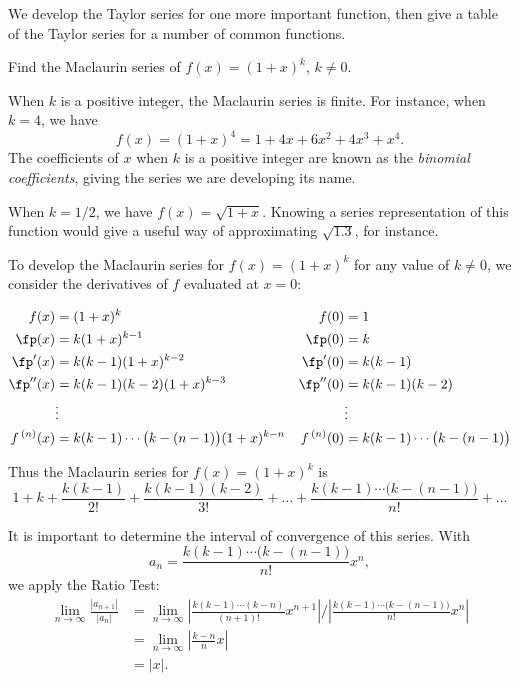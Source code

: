 We develop the Taylor series for one more important function, then give a table of the Taylor series for a number of common functions.

{Find the Maclaurin series of $f(x) = (1+x)^k$, $k\neq 0$.
}
{When $k$ is a positive integer, the Maclaurin series is finite. For instance, when $k=4$, we have 
$$f(x) = (1+x)^4 = 1+4x+6x^2+4x^3+x^4.$$
The coefficients of $x$ when $k$ is a positive integer are known as the \emph{binomial coefficients}, giving the series we are developing its name.

When $k=1/2$, we have $f(x) = \sqrt{1+x}$. Knowing a series representation of this function would give a useful way of approximating $\sqrt{1.3}$, for instance.

To develop the Maclaurin series for $f(x) = (1+x)^k$ for any value of $k\neq0$, we consider the derivatives of $f$ evaluated at $x=0$:

\noindent\hskip-30pt\begin{minipage}{1.3\linewidth}
\small
\begin{align*}
f(x) &= (1+x)^k & f(0) &= 1\\
\fp(x) &= k(1+x)^{k-1} & \fp(0) &=k\\
\fp'(x) &= k(k-1)(1+x)^{k-2} & \fp'(0) &=k(k-1)\\
\fp''(x) &= k(k-1)(k-2)(1+x)^{k-3} & \fp''(0) &=k(k-1)(k-2)\\
&\vdots & &\vdots\\
f\,^{(n)}(x) &= k(k-1)\cdots\big(k-(n-1)\big)(1+x)^{k-n} & f\,^{(n)}(0) &=k(k-1)\cdots\big(k-(n-1)\big)
\end{align*}
\end{minipage}

Thus the Maclaurin series for $f(x) = (1+x)^k$ is
$$1+ k + \frac{k(k-1)}{2!} + \frac{k(k-1)(k-2)}{3!} + \ldots + \frac{k(k-1)\cdots\big(k-(n-1)\big)}{n!}+\ldots$$

It is important to determine the interval of convergence of this series. With 
$$a_n = \frac{k(k-1)\cdots\big(k-(n-1)\big)}{n!}x^n,$$
we apply the Ratio Test:
\begin{align*}
\lim_{n\to\infty}\frac{|a_{n+1}|}{|a_n|}&=\lim_{n\to\infty} \left|\frac{k(k-1)\cdots(k-n)}{(n+1)!}x^{n+1}\right|\Bigg/\left|\frac{k(k-1)\cdots\big(k-(n-1)\big)}{n!}x^n\right|\\
		&=\lim_{n\to\infty} \left|\frac{k-n}{n}x\right|\\
		&= |x|.
\end{align*}

}
